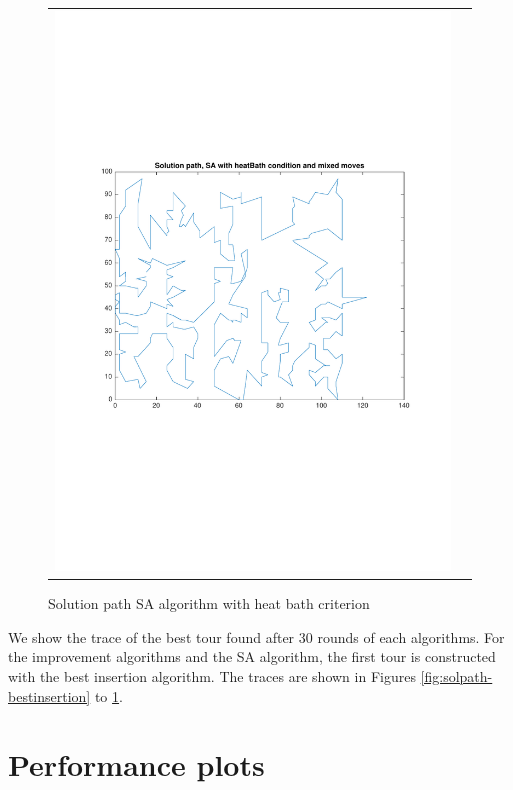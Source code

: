 \documentclass[a4paper, 11pt]{scrartcl}
\begin{document}
\begin{figure}[!ht]
\begin{tabular}{cc}
    \includegraphics[scale=0.4, trim={3cm 6cm 1cm 6cm}]{../figures/solutionPath_SA_heatBath_mixed.pdf}
  \end{tabular}
  \caption{Solution path SA algorithm with heat bath criterion}
  \label{fig:solpath-SA-heatBath}
\end{figure}

We show the trace of the best tour found after 30 rounds of each algorithms. For the improvement algorithms
and the SA algorithm, the first tour is constructed with the best insertion algorithm. The traces are shown in
Figures \ref{fig:solpath-bestinsertion} to \ref{fig:solpath-SA-heatBath}.



\section{Performance plots}
\label{sec:performance-plots}
\end{document}
